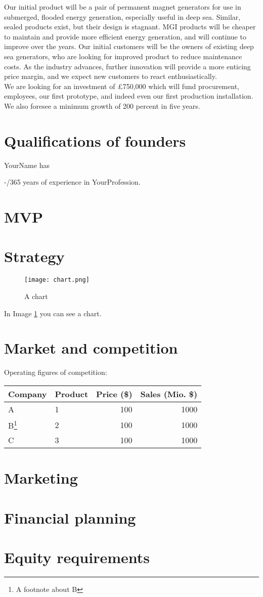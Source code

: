 \documentclass[a4paper,11pt]{article}
\newcounter{dateone}
\newcounter{datetwo}
\newcommand{\difftoday}[3]{%
      \setmydatenumber{dateone}{\the\year}{\the\month}{\the\day}%
      \setmydatenumber{datetwo}{#1}{#2}{#3}%
      \addtocounter{datetwo}{-\thedateone}%
      \the\numexpr-\thedatetwo/365\relax
}
\begin{document}
Our initial product will be a pair of permanent magnet generators for use in submerged, flooded energy generation, especially useful in deep sea. Similar, sealed products exist, but their design is stagnant. MGI products will be cheaper to maintain and provide more efficient energy generation, and will continue to improve over the years. Our initial customers will be the owners of existing deep sea generators, who are looking for improved product to reduce maintenance costs. As the industry advances, further innovation will provide a more enticing price margin, and we expect new customers to react enthusiastically.\\

We are looking for an investment of £750,000 which will fund procurement, employees, our first prototype, and indeed even our first production installation. We also foresee a minimum growth of 200 percent in five years.
\pagebreak

\section{Qualifications of founders}
YourName has \difftoday{2010}{06}{01} years of experience in YourProfession.

\section{MVP}

\section{Strategy}
\begin{figure}[ht]
\centering
\texttt{[image: chart.png]}
\caption{A chart}
\label{fig:chart}
\end{figure}
In Image \ref{fig:chart} you can see a chart.

\section{Market and competition}
Operating figures of competition:
\begin{center}
\begin{tabular}{l|l|r|r}
Company & Product & Price (\$) & \pbox{20cm}{Sales\\(Mio. \$)}\\
\hline
A & 1 & 100 & 1000\\
B\footnote{A footnote about B} & 2 & 100 & 1000\\
C & 3 & 100 & 1000\\
\end{tabular}
\end{center}

\section{Marketing}

\section{Financial planning}

\section{Equity requirements}
\end{document}
